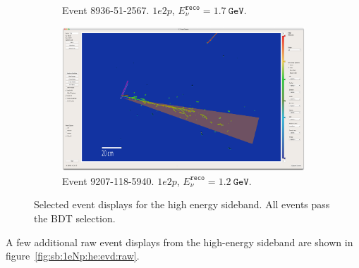 \begin{figure}[H]
\begin{center}
\begin{subfigure}{0.45\textwidth}
    \caption{Event 8936-51-2567. $1e2p$, $E_\nu^{\texttt{reco}} = 1.7~\texttt{GeV}$.}
    \end{subfigure}
    \begin{subfigure}{0.45\textwidth}
    \includegraphics[width=1.00\textwidth]{Sidebands/Figures/1eNp/HighEnergy/EVD/evt-9207-118-5940_reco2.png}
    \caption{Event 9207-118-5940. $1e2p$, $E_\nu^{\texttt{reco}} = 1.2~\texttt{GeV}$.}
    \end{subfigure}
    \caption{\label{fig:sb:1eNp:he:evd} Selected event displays for the \npsel high energy sideband. All events pass the BDT selection.}
    \end{center}
\end{figure}

A few additional raw event displays from the \npsel high-energy sideband are shown in figure~\ref{fig:sb:1eNp:he:evd:raw}.

